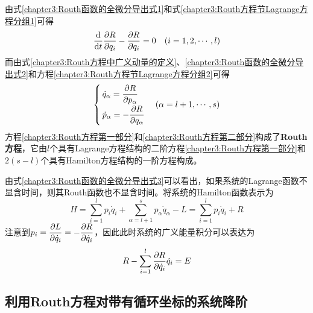 由式\eqref{chapter3:Routh函数的全微分导出式1}和式\eqref{chapter3:Routh方程节Lagrange方程分组1}可得
\begin{equation}
	\dfrac{\mathrm{d}}{\mathrm{d} t} \frac{\partial R}{\partial q_i} - \frac{\partial R}{\partial q_i} = 0\quad (i=1,2,\cdots,l) 
	\label{chapter3:Routh方程第一部分}
\end{equation}
而由式\eqref{chapter3:Routh方程中广义动量的定义}、\eqref{chapter3:Routh函数的全微分导出式2}和方程\eqref{chapter3:Routh方程节Lagrange方程分组2}可得
\begin{equation}
\begin{cases}
	\dot{q}_\alpha = \dfrac{\partial R}{\partial p_\alpha} \\[1.5ex]
	\dot{p}_\alpha = -\dfrac{\partial R}{\partial q_\alpha}
\end{cases}
(\alpha=l+1,\cdots,s)
\label{chapter3:Routh方程第二部分}
\end{equation}
方程\eqref{chapter3:Routh方程第一部分}和\eqref{chapter3:Routh方程第二部分}构成了{\bf Routh方程}，它由$l$个具有Lagrange方程结构的二阶方程\eqref{chapter3:Routh方程第一部分}和$2(s-l)$个具有Hamilton方程结构的一阶方程构成。

由式\eqref{chapter3:Routh函数的全微分导出式3}可以看出，如果系统的Lagrange函数不显含时间，则其Routh函数也不显含时间。将系统的Hamilton函数表示为
\begin{equation}
	H = \sum_{i=1}^l p_i\dot{q}_i + \sum_{\alpha=l+1}^s p_\alpha\dot{q}_\alpha-L = \sum_{i=1}^l p_i\dot{q}_i + R
\end{equation}
注意到$p_i = \dfrac{\partial L}{\partial \dot{q}_i} = -\dfrac{\partial R}{\partial \dot{q}_i}$，因此此时系统的广义能量积分可以表达为
\begin{equation}
	R - \sum_{i=1}^l \frac{\partial R}{\partial \dot{q}_i}\dot{q}_i = E
	\label{chapter3:用Routh函数表示的广义能量积分}
\end{equation}

\subsection{利用Routh方程对带有循环坐标的系统降阶}

